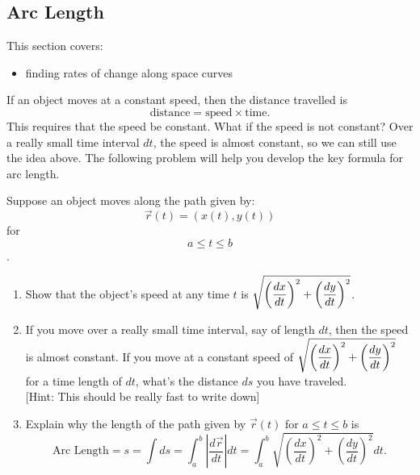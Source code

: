 \subsection{Arc Length}\label{arc length}
This section covers:
\begin{itemize}
	\item finding rates of change along space curves
\end{itemize}

\noindent If an object moves at a constant speed, then the distance travelled is 
$$\text{distance} = \text{speed}\times\text{time}.$$
This requires that the speed be constant.  What if the speed is not constant? Over a really small time interval $dt$, the speed is almost constant, so we can still use the idea above. The following problem will help you develop the key formula for arc length.

\begin{problem} 
Suppose an object moves along the path given by:  $$\vec r(t)=(x(t),y(t))$$ for $$a\leq t\leq b$$. 
\begin{enumerate}
\item Show that the object's speed at any time $t$ is 
$\displaystyle\sqrt{\left(\frac{dx}{dt}\right)^2+\left(\frac{dy}{dt}\right)^2}$.
\item If you move over a really small time interval, say of length $dt$, then the speed is almost constant. If you move at a constant speed of $\displaystyle\sqrt{\left(\frac{dx}{dt}\right)^2+\left(\frac{dy}{dt}\right)^2}$ for a time length of $dt$, what's the distance $ds$ you have traveled.\\

[Hint: This should be really fast to write down]
\item  Explain why the length of the path given by $\vec r(t)$ for $a\leq t\leq b$ is  
$$\text{Arc Length}=s=\int ds=\int_a^b \left|\frac{d\vec r}{dt}\right| dt=\int_a^b \sqrt{\left(\frac{dx}{dt}\right)^2+\left(\frac{dy}{dt}\right)^2}dt.$$\label{arc length formula}
\end{enumerate}
\end{problem}

